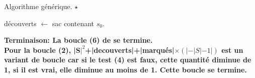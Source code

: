 \documentclass[french, 11pt]{article}
\begin{document}
\begin{defi}{Algorithme générique. $\star$}{}
    \begin{algorithm}[H]
        \LinesNumbered
        \caption{Parcours générique.}
        découverts $\gets$ sac contenant $s_0$.\\
    \end{algorithm}
    \bf{Terminaison:} La boucle (6) de se termine.\\
    Pour la boucle (2), |S$|^2$+|decouverts|+|marqués|$\times(|-|S|-1|)$ est un variant de boucle car si le test (4) est faux, cette quantité diminue de 1, si il est vrai, elle diminue au moins de 1. Cette boucle se termine.
\end{defi}

\pagebreak
\end{document}
